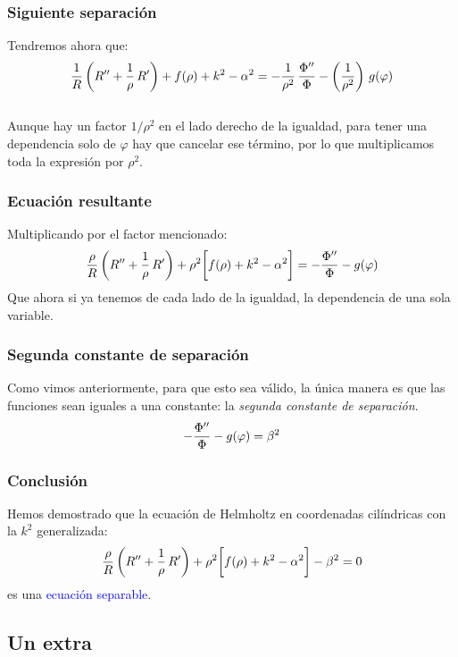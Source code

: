 \documentclass[12pt]{beamer}
\begin{document}
\begin{frame}
\frametitle{Siguiente separación}
Tendremos ahora que:
\pause
\begin{align*}
\dfrac{1}{R} \left( {R}^{\prime \prime} + \dfrac{1}{\rho} \, {R}^{\prime} \right) + f(\rho) + k^{2} - \alpha^{2} = - \dfrac{1}{\rho^{2}} \, \dfrac{{\Phi}^{\prime \prime}}{\Phi} - \left( \dfrac{1}{\rho^{2}} \right) \, g(\varphi)
\end{align*}
\\
\bigskip
\pause
Aunque hay un factor $1/\rho^{2}$ en el lado derecho de la igualdad, para tener una dependencia solo de $\varphi$ hay que cancelar ese término, \pause por lo que multiplicamos toda la expresión por $\rho^{2}$.
\end{frame}
\begin{frame}
\frametitle{Ecuación resultante}
Multiplicando por el factor mencionado:
\pause
\begin{align*}
\dfrac{\rho}{R} \left( {R}^{\prime \prime} + \dfrac{1}{\rho} \, {R}^{\prime} \right) + \rho^{2} \bigg[ f(\rho) + k^{2} - \alpha^{2} \bigg] = - \dfrac{{\Phi}^{\prime \prime}}{\Phi} - g(\varphi)
\end{align*}
\pause
Que ahora si ya tenemos de cada lado de la igualdad, la dependencia de una sola variable.
\end{frame}
\begin{frame}
\frametitle{Segunda constante de separación}
Como vimos anteriormente, para que esto sea válido, la única manera es que las funciones sean iguales a una constante: \pause la \emph{segunda constante de separación}.
\pause
\begin{align*}
- \dfrac{{\Phi}^{\prime \prime}}{\Phi} - g(\varphi) = \beta^{2}
\end{align*}
\end{frame}
\begin{frame}
\frametitle{Conclusión}
Hemos demostrado que la ecuación de Helmholtz en coordenadas cilíndricas con la $k^{2}$ generalizada:
\pause
\begin{align*}
\dfrac{\rho}{R} \left( {R}^{\prime \prime} + \dfrac{1}{\rho} \, {R}^{\prime} \right) + \rho^{2} \bigg[ f(\rho) + k^{2} - \alpha^{2} \bigg] - \beta^{2} = 0
\end{align*}
\pause
es una \textcolor{blue}{ecuación separable}.
\end{frame}

\subsection{Un extra}
\end{document}
